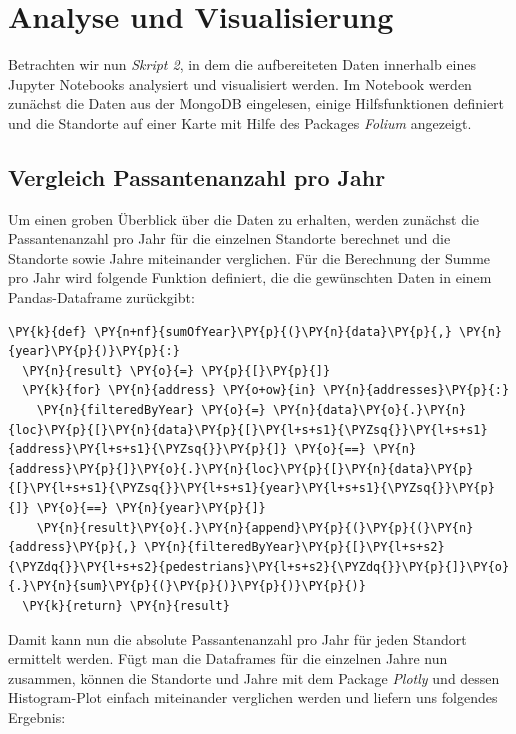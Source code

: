 \section{Analyse und Visualisierung}
Betrachten wir nun \emph{Skript 2}, in dem die aufbereiteten Daten innerhalb eines Jupyter Notebooks analysiert und visualisiert werden. Im Notebook werden zunächst die Daten aus der MongoDB eingelesen, einige Hilfsfunktionen definiert und die Standorte auf einer Karte mit Hilfe des Packages \emph{Folium} angezeigt.

\subsection{Vergleich Passantenanzahl pro Jahr}
Um einen groben Überblick über die Daten zu erhalten, werden zunächst die Passantenanzahl pro Jahr für die einzelnen Standorte berechnet und die Standorte sowie Jahre miteinander verglichen. Für die Berechnung der Summe pro Jahr wird folgende Funktion definiert, die die gewünschten Daten in einem Pandas-Dataframe zurückgibt:

\bigbreak
\begin{tcolorbox}[breakable, size=fbox, boxrule=1pt, pad at break*=1mm,colback=cellbackground, colframe=cellborder]
\begin{Verbatim}[commandchars=\\\{\}]
\PY{k}{def} \PY{n+nf}{sumOfYear}\PY{p}{(}\PY{n}{data}\PY{p}{,} \PY{n}{year}\PY{p}{)}\PY{p}{:}
  \PY{n}{result} \PY{o}{=} \PY{p}{[}\PY{p}{]}
  \PY{k}{for} \PY{n}{address} \PY{o+ow}{in} \PY{n}{addresses}\PY{p}{:}
    \PY{n}{filteredByYear} \PY{o}{=} \PY{n}{data}\PY{o}{.}\PY{n}{loc}\PY{p}{[}\PY{n}{data}\PY{p}{[}\PY{l+s+s1}{\PYZsq{}}\PY{l+s+s1}{address}\PY{l+s+s1}{\PYZsq{}}\PY{p}{]} \PY{o}{==} \PY{n}{address}\PY{p}{]}\PY{o}{.}\PY{n}{loc}\PY{p}{[}\PY{n}{data}\PY{p}{[}\PY{l+s+s1}{\PYZsq{}}\PY{l+s+s1}{year}\PY{l+s+s1}{\PYZsq{}}\PY{p}{]} \PY{o}{==} \PY{n}{year}\PY{p}{]}
    \PY{n}{result}\PY{o}{.}\PY{n}{append}\PY{p}{(}\PY{p}{(}\PY{n}{address}\PY{p}{,} \PY{n}{filteredByYear}\PY{p}{[}\PY{l+s+s2}{\PYZdq{}}\PY{l+s+s2}{pedestrians}\PY{l+s+s2}{\PYZdq{}}\PY{p}{]}\PY{o}{.}\PY{n}{sum}\PY{p}{(}\PY{p}{)}\PY{p}{)}\PY{p}{)}
  \PY{k}{return} \PY{n}{result}
\end{Verbatim}
\end{tcolorbox}
\bigbreak

Damit kann nun die absolute Passantenanzahl pro Jahr für jeden Standort ermittelt werden. Fügt man die Dataframes für die einzelnen Jahre nun zusammen, können die Standorte und Jahre mit dem Package \emph{Plotly} und dessen Histogram-Plot einfach miteinander verglichen werden und liefern uns folgendes Ergebnis:

